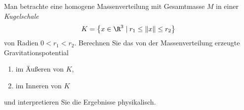                    \begin{prob}[Gravitation]
Man betrachte eine homogene Massenverteilung mit Gesamtmasse $M$ in einer {\em Kugelschale}
$$
K = \left\{ x \in \R^3 \mid r_1 \le \|x\| \le r_2 \right\}
$$
von Radien $0 <r_1 <r_2$. Berechnen Sie das von der Massenverteilung erzeugte Gravitationspotential
\begin{enumerate}[label = (\alph*)]
	\item im \"Au\ss eren von $K$,
	\item im Inneren von $K$
\end{enumerate}
und interpretieren Sie die Ergebnisse physikalisch. 
\vspace{2mm}
                    \end{prob}
